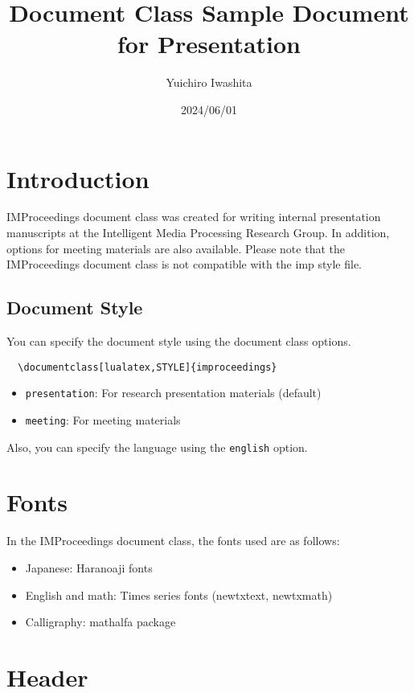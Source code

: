 \documentclass[
  platex,
  dvipdfmx,
  presentation,
  english
]{improceedings}
\title{\pkg{IMProceedings} Document Class Sample Document for Presentation}
\date{2024/06/01}
\author{Yuichiro Iwashita}
\newcommand{\pkg}[1]{\textsf{#1}}
\newcommand{\code}[1]{\texttt{#1}}
\begin{document}
\maketitle

\section{Introduction}

\pkg{IMProceedings} document class was created for writing internal presentation manuscripts at the Intelligent Media Processing Research Group.
In addition, options for meeting materials are also available.
Please note that the \pkg{IMProceedings} document class is not compatible with the \pkg{imp} style file.

\subsection{Document Style}

You can specify the document style using the document class options.
\begin{verbatim}
  \documentclass[lualatex,STYLE]{improceedings}
\end{verbatim}
\begin{itemize}
  \item \code{presentation}: For research presentation materials (default)
  \item \code{meeting}: For meeting materials
\end{itemize}
Also, you can specify the language using the \code{english} option.

\section{Fonts}

In the \pkg{IMProceedings} document class, the fonts used are as follows:
\begin{itemize}
  \item Japanese: Haranoaji fonts
  \item English and math: Times series fonts (\pkg{newtxtext}, \pkg{newtxmath})
  \item Calligraphy: \pkg{mathalfa} package
\end{itemize}

\section{Header}
\end{document}

